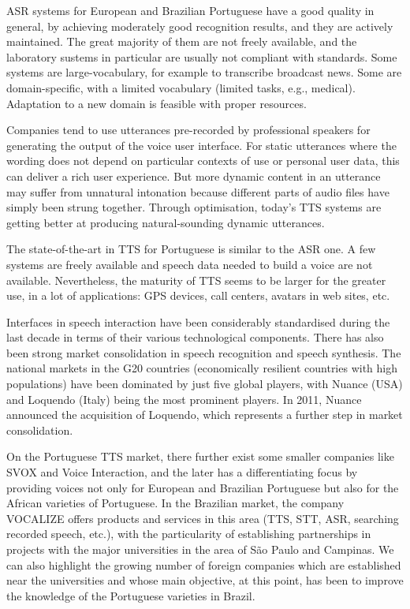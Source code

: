 \begin{multicols}{2}
ASR systems for European and Brazilian Portuguese have a good quality in general, by achieving moderately good recognition results, and they are actively maintained. The great majority of them are not freely available, and the laboratory sustems in particular are usually not compliant with standards. Some systems are large-vocabulary, for example to transcribe broadcast news. Some are domain-specific, with a limited vocabulary (limited tasks, e.g., medical). Adaptation to a new domain is feasible with proper resources.


Companies tend to use utterances pre-recorded by professional speakers for generating the output of the voice user interface. For static utterances where the wording does not depend on particular contexts of use or personal user data, this can deliver a rich user experience. But more dynamic content in an utterance may suffer from unnatural intonation because different parts of audio files have simply been strung together. Through optimisation, today’s TTS systems are getting better at producing natural-sounding dynamic utterances.

The state-of-the-art in TTS for Portuguese is similar to the ASR one. A few systems are freely available and speech data needed to build a voice are not available. Nevertheless, the maturity of TTS seems to be larger for the greater use, in a lot of applications: GPS devices, call centers, avatars in web sites, etc.

Interfaces in speech interaction have been considerably standardised during the last decade in terms of their various technological components. There has also been strong market consolidation in speech recognition and speech synthesis. The national markets in the G20 countries (economically resilient countries with high populations) have been dominated by just five global players, with Nuance (USA) and Loquendo (Italy) being the most prominent players. In 2011, Nuance announced the acquisition of Loquendo, which represents a further step in market consolidation.

On the Portuguese TTS market, there further exist some smaller companies like SVOX and Voice Interaction, and the later has a differentiating focus by providing voices not only for European and Brazilian Portuguese but also for the African varieties of Portuguese. In the Brazilian market, the company VOCALIZE offers products and services in this area (TTS, STT, ASR, searching recorded speech, etc.), with the particularity of establishing partnerships in projects with the major universities in the area of São Paulo and Campinas\cite{neto}. We can also highlight the growing number of foreign companies which are established near the universities and whose main objective, at this point, has been to improve the knowledge of the Portuguese varieties in Brazil.


\end{multicols}
